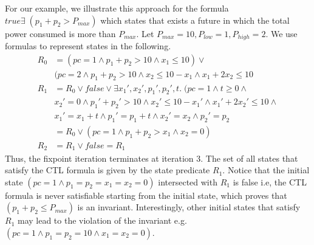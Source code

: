 For our example, we illustrate this approach for the formula $true \exists \;(p_1 + p_2 > P_{max})$ which 
states that exists a future in which the total power consumed is more than $P_{max}$.
Let $P_{max} = 10, P_{low} = 1, P_{high} = 2$.
We use formulas to represent states in the following.
%
\begin{align*}
R_0 &= (pc = 1 \wedge p_1 + p_2 > 10 \wedge x_1 \le 10) \vee \\
	& (pc = 2 \wedge p_1 + p_2 > 10 \wedge x_2 \le 10 - x_1 \wedge x_1+2x_2 \le 10 \\
R_1 &= R_0 \vee false \vee \exists x_1',x_2',p_1',p_2',t. \; (pc=1 \wedge t \ge 0 \wedge \\
	& x_2'=0 \wedge p_1'+p_2'>10 \wedge x_2' \le 10 - x_1' \wedge x_1'+2x_2' \le 10 \wedge \\
	& x_1' = x_1 + t \wedge p_1' = p_1 + t \wedge x_2' = x_2 \wedge p_2' = p_2 \\
	&= R_0 \vee (pc=1 \wedge p_1+p_2 >x_1 \wedge x_2 = 0) \\
R_2 &= R_1 \vee false	= R_1
\end{align*}
%
Thus, the fixpoint iteration terminates at iteration 3. The set of all states that satisfy the 
CTL formula is given by the state predicate $R_1$. Notice that the initial state  
$(pc=1 \wedge p_1=p_2=x_1=x_2=0)$ intersected with $R_1$ is false i.e, the CTL formula is never
satisfiable starting from the initial state, which proves that $(p_1 + p_2 \le P_{max})$ is an invariant.
Interestingly, other initial states that satisfy $R_1$ may lead to the violation of the invariant
e.g. $(pc=1 \wedge p_1=p_2=10 \wedge x_1=x_2=0)$.